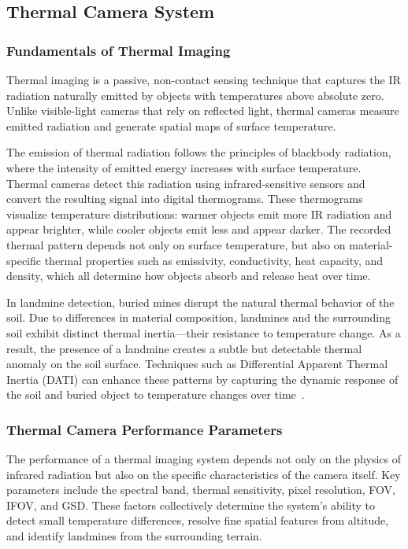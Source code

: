 \subsection{Thermal Camera System}\label{thermal_system}

\subsubsection{Fundamentals of Thermal Imaging}\label{thermal_fundamental}

Thermal imaging is a passive, non-contact sensing technique that captures the \gls{IR} radiation naturally emitted by objects with temperatures above absolute zero. Unlike visible-light cameras that rely on reflected light, thermal cameras measure emitted radiation and generate spatial maps of surface temperature.

The emission of thermal radiation follows the principles of blackbody radiation, where the intensity of emitted energy increases with surface temperature. Thermal cameras detect this radiation using infrared-sensitive sensors and convert the resulting signal into digital thermograms. These thermograms visualize temperature distributions: warmer objects emit more \gls{IR} radiation and appear brighter, while cooler objects emit less and appear darker. The recorded thermal pattern depends not only on surface temperature, but also on material-specific thermal properties such as emissivity, conductivity, heat capacity, and density, which all determine how objects absorb and release heat over time.

In landmine detection, buried mines disrupt the natural thermal behavior of the soil. Due to differences in material composition, landmines and the surrounding soil exhibit distinct thermal inertia—their resistance to temperature change. As a result, the presence of a landmine creates a subtle but detectable thermal anomaly on the soil surface. Techniques such as Differential Apparent Thermal Inertia (DATI) can enhance these patterns by capturing the dynamic response of the soil and buried object to temperature changes over time~\cite{nikulin2018detection}.



\subsubsection{Thermal Camera Performance Parameters}\label{thermal_parameter}

The performance of a thermal imaging system depends not only on the physics of infrared radiation but also on the specific characteristics of the camera itself. Key parameters include the spectral band, thermal sensitivity, pixel resolution, \gls{FOV}, \gls{IFOV}, and \gls{GSD}. These factors collectively determine the system’s ability to detect small temperature differences, resolve fine spatial features from altitude, and identify landmines from the surrounding terrain.


